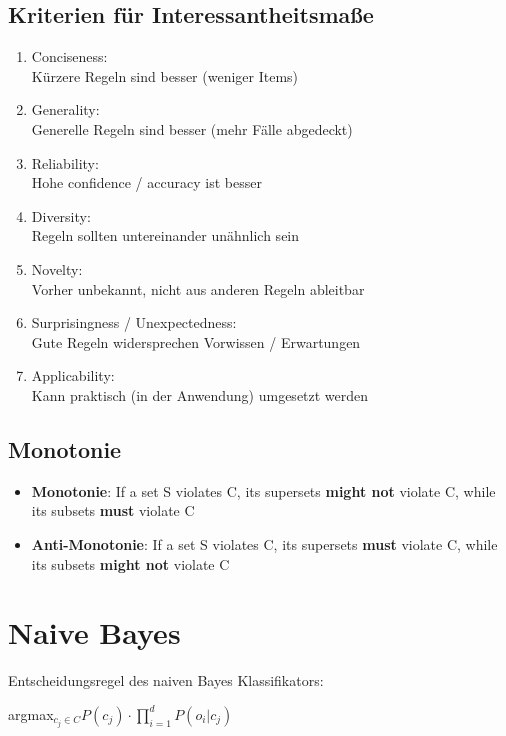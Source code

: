 \documentclass{article}
\begin{document}
\subsection{Kriterien für Interessantheitsmaße}
\begin{enumerate}
    \item Conciseness: \\
    Kürzere Regeln sind besser (weniger Items)
    \item Generality: \\
    Generelle Regeln sind besser (mehr Fälle abgedeckt)
    \item Reliability: \\
    Hohe confidence / accuracy ist besser
    \item Diversity: \\
    Regeln sollten untereinander unähnlich sein
    \item Novelty: \\
    Vorher unbekannt, nicht aus anderen Regeln ableitbar
    \item Surprisingness / Unexpectedness: \\
    Gute Regeln widersprechen Vorwissen / Erwartungen
    \item Applicability: \\ 
    Kann praktisch (in der Anwendung) umgesetzt werden
\end{enumerate}
\subsection{Monotonie}
\begin{itemize}
    \item \textbf{Monotonie}: If a set S violates C, its supersets
    \textbf{might not} violate C, while its subsets \textbf{must}
    violate C
    \item \textbf{Anti-Monotonie}: If a set S violates C, its supersets
    \textbf{must} violate C, while its subsets \textbf{might not}
    violate C
\end{itemize}
\section{Naive Bayes}
Entscheidungsregel des naiven Bayes Klassifikators:
\begin{center}
    argmax$_{c_j \in C} P(c_j) \cdot \prod_{i = 1}^{d} P(o_i | c_j)$ 
\end{center}
\end{document}
